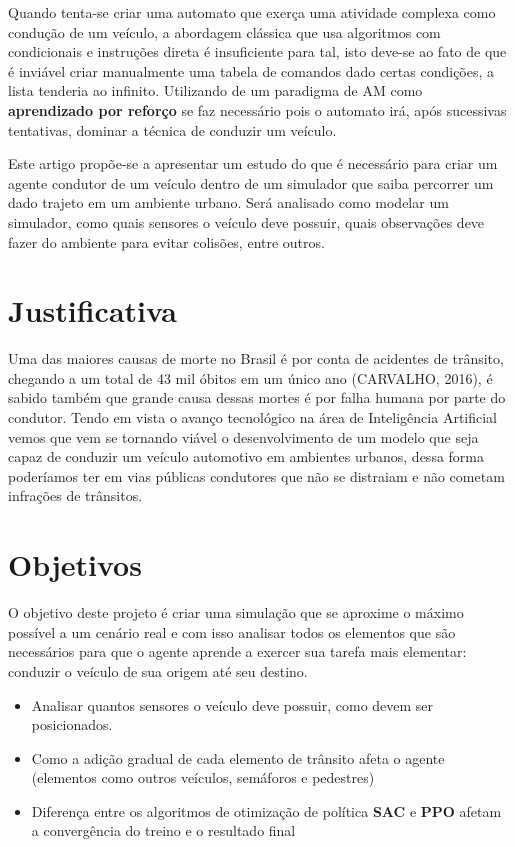 Quando tenta-se criar uma automato que exerça uma atividade complexa como condução de um veículo, a abordagem clássica que usa algoritmos com condicionais e instruções direta é insuficiente para tal, isto deve-se ao fato de que é inviável criar manualmente uma tabela de comandos dado certas condições, a lista tenderia ao infinito. Utilizando de um paradigma de AM como \textbf{aprendizado por reforço} se faz necessário pois o automato irá, após sucessivas tentativas, dominar a técnica de conduzir um veículo.

\begin{comment}
    Introduzir brevemente o PPO e SAC aqui
\end{comment}

Este artigo propõe-se a apresentar um estudo do que é necessário para criar um agente condutor de um veículo dentro de um simulador que saiba percorrer um dado trajeto em um ambiente urbano. Será analisado como modelar um simulador, como quais sensores o veículo deve possuir, quais observações deve fazer do ambiente para evitar colisões, entre outros.


\section*{Justificativa}\label{sec:justificativa}
Uma das maiores causas de morte no Brasil é por conta de acidentes de trânsito, chegando a um total de 43 mil óbitos em um único ano (CARVALHO, 2016), é sabido também que grande causa dessas mortes é por falha humana por parte do condutor. Tendo em vista o avanço tecnológico na área de Inteligência Artificial vemos que vem se tornando viável o desenvolvimento de um modelo que seja capaz de conduzir um veículo automotivo em ambientes urbanos, dessa forma poderíamos ter em vias públicas condutores que não se distraiam e não cometam infrações de trânsitos.


\section*{Objetivos}\label{sec:objetivos}
O objetivo deste projeto é criar uma simulação que se aproxime o máximo possível a um cenário real e com isso analisar todos os elementos que são necessários para que o agente aprende a exercer sua tarefa mais elementar: conduzir o veículo de sua origem até seu destino.
\begin{itemize}
    \item Analisar quantos sensores o veículo deve possuir, como devem ser posicionados. 
    \item Como a adição gradual de cada elemento de trânsito afeta o agente (elementos como outros veículos, semáforos e pedestres)
    \item Diferença entre os algoritmos de otimização de política \textbf{SAC} e \textbf{PPO} afetam a convergência do treino e o resultado final
\end{itemize}

